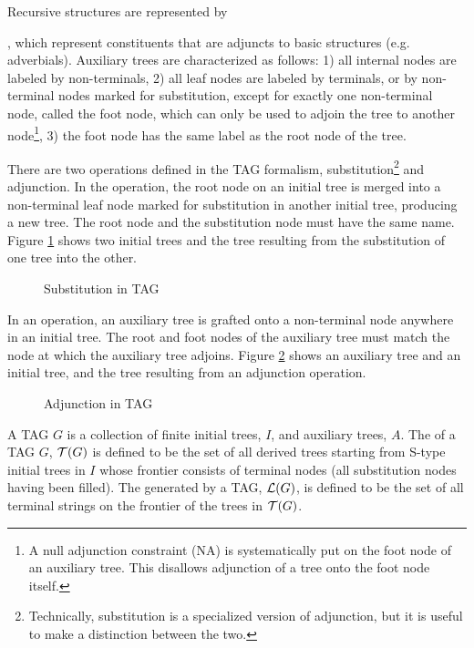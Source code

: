 Recursive structures are represented by {, which
represent constituents that are adjuncts to basic structures (e.g. adverbials).
Auxiliary trees are characterized as follows: 1) all internal nodes are labeled
by non-terminals, 2) all leaf nodes are labeled by terminals, or by
non-terminal nodes marked for substitution, except for exactly one non-terminal
node, called the foot node, which can only be used to adjoin the tree to
another node\footnote{A null adjunction constraint (NA) is systematically put
on the foot node of an auxiliary tree. This disallows adjunction of a tree onto
the foot node itself.}, 3) the foot node has the same label as the root node of
the tree.

There are two operations defined in the TAG formalism,
substitution\footnote{Technically, substitution is a specialized version of
adjunction, but it is useful to make a distinction between the two.} and
adjunction.  In the  operation, the root node on an
initial tree is merged into a non-terminal leaf node marked for substitution in
another initial tree, producing a new tree.  The root node and the substitution
node must have the same name.  Figure \ref{proto-subst} shows two initial trees
and the tree resulting from the substitution of one tree into the other.

\begin{figure}[htb]
\centering
{}
\caption{Substitution in TAG}
\label{proto-subst}
\end{figure}

In an  operation, an auxiliary tree is grafted onto a
non-terminal node anywhere in an initial tree.  The root and foot nodes of the
auxiliary tree must match the node at which the auxiliary tree adjoins.  Figure
\ref{proto-adjunction} shows an auxiliary tree and an initial tree, and the
tree resulting from an adjunction operation.

\begin{figure}[htb]
\centering
{}
\caption{Adjunction in TAG}
\label{proto-adjunction}
\end{figure}

A TAG $G$ is a collection of finite initial trees, $I$, and auxiliary trees,
$A$.  The  of a TAG $G$, ${\cal T}(G)$ is defined to be the
set of all derived trees starting from S-type initial trees in $I$ whose
frontier consists of terminal nodes (all substitution nodes having been
filled). The  generated by a TAG, ${\cal L}(G)$, is
defined to be the set of all terminal strings on the frontier of the trees in
${\cal T}(G)$.

}
